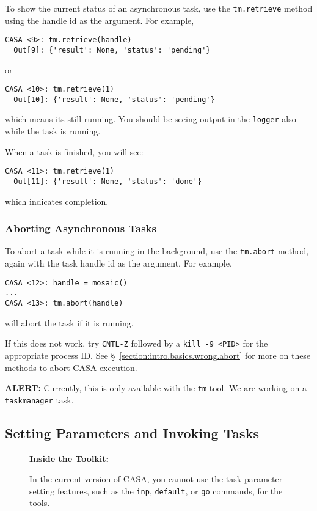 To show the current status of an asynchronous task, use the
{\tt tm.retrieve} method using the handle id as the argument.
For example,
\small
\begin{verbatim}
CASA <9>: tm.retrieve(handle)
  Out[9]: {'result': None, 'status': 'pending'}
\end{verbatim}
\normalsize
or
\small
\begin{verbatim}
CASA <10>: tm.retrieve(1)
  Out[10]: {'result': None, 'status': 'pending'}
\end{verbatim}
\normalsize
which means its still running.  You should be seeing output in
the {\tt logger} also while the task is running.  

When a task is finished, you will see:
\small
\begin{verbatim}
CASA <11>: tm.retrieve(1)
  Out[11]: {'result': None, 'status': 'done'}
\end{verbatim}
\normalsize
which indicates completion.

\subsubsection{Aborting Asynchronous Tasks}
\label{section:intro.tasks.async.abort}

To abort a task while it is running in the background, use the
{\tt tm.abort} method, again with the task handle id as the
argument.  For example,
\small
\begin{verbatim}
CASA <12>: handle = mosaic()
...
CASA <13>: tm.abort(handle)
\end{verbatim}
\normalsize
will abort the task if it is running.

If this does not work,
try {\tt CNTL-Z} followed by a {\tt kill -9 <PID>} for the appropriate
process ID.
See \S~\ref{section:intro.basics.wrong.abort} for more on these
methods to abort CASA execution.

{\bf ALERT:} Currently, this is only available with the 
{\tt tm} tool.  We are working on a {\tt taskmanager} task.

\subsection{Setting Parameters and Invoking Tasks}
\label{section:intro.tasks.setpar}

\begin{wrapfigure}{r}{2.5in}
  \begin{boxedminipage}{2.5in}
     \centerline{\bf Inside the Toolkit:}
     In the current version of CASA, you cannot use the
     task parameter setting features, such as the {\tt inp},
     {\tt default}, or {\tt go} commands, for the tools.
  \end{boxedminipage}
\end{wrapfigure}

